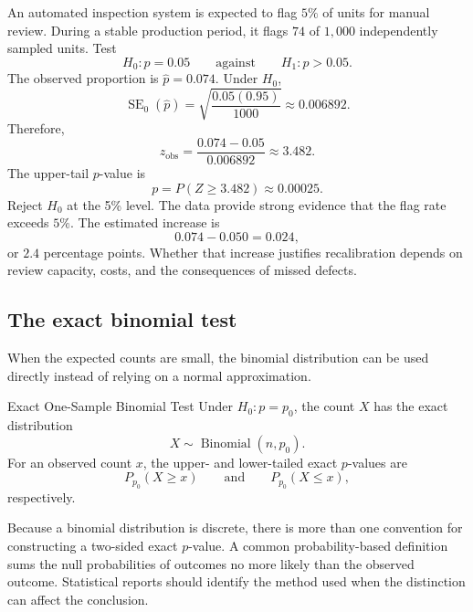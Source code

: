\begin{example}\par
An automated inspection system is expected to flag $5\%$ of units for manual review. During a stable production period, it flags $74$ of $1{,}000$ independently sampled units. Test
\[
H_0:p=0.05
\qquad\text{against}\qquad
H_1:p>0.05.
\]
The observed proportion is $\hat p=0.074$. Under $H_0$,
\[
\operatorname{SE}_0(\hat p)
=\sqrt{\frac{0.05(0.95)}{1000}}
\approx0.006892.
\]
Therefore,
\[
z_{\mathrm{obs}}
=\frac{0.074-0.05}{0.006892}
\approx3.482.
\]
The upper-tail $p$-value is
\[
p=P(Z\geq3.482)\approx0.00025.
\]
Reject $H_0$ at the 5\% level. The data provide strong evidence that the flag rate exceeds $5\%$. The estimated increase is
\[
0.074-0.050=0.024,
\]
or $2.4$ percentage points. Whether that increase justifies recalibration depends on review capacity, costs, and the consequences of missed defects.
\end{example}

\subsection{The exact binomial test}

When the expected counts are small, the binomial distribution can be used directly instead of relying on a normal approximation.

\begin{definition}{Exact One-Sample Binomial Test}
Under $H_0:p=p_0$, the count $X$ has the exact distribution
\[
X\sim\operatorname{Binomial}(n,p_0).
\]
For an observed count $x$, the upper- and lower-tailed exact $p$-values are
\[
P_{p_0}(X\geq x)
\qquad\text{and}\qquad
P_{p_0}(X\leq x),
\]
respectively.
\end{definition}

Because a binomial distribution is discrete, there is more than one convention for constructing a two-sided exact $p$-value. A common probability-based definition sums the null probabilities of outcomes no more likely than the observed outcome. Statistical reports should identify the method used when the distinction can affect the conclusion.

